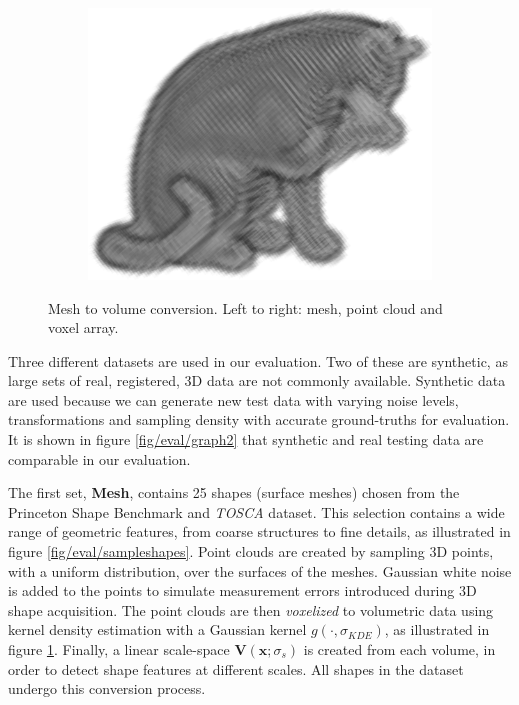 \begin{figure}[ht]
	\begin{subfigure}[t]{0.31\linewidth} \centering 
		\includegraphics[height=0.85\linewidth]{./fig/eval/cat_volume.png}
	\end{subfigure}
	\caption{Mesh to volume conversion. Left to right: mesh, point cloud and voxel array.} 
	\label{fig/eval/vol_conversion}
\end{figure}

Three different datasets are used in our evaluation. Two of these are synthetic, as large sets of real, registered, 3D data are not commonly available. Synthetic data are used because we can generate new test data with varying noise levels, transformations and sampling density with accurate ground-truths for evaluation. It is shown in figure \ref{fig/eval/graph2} that synthetic and real testing data are comparable in our evaluation. 

The first set, \textbf{Mesh}, contains 25 shapes (surface meshes) chosen from the Princeton Shape Benchmark \cite{Shilane2004} and \emph{TOSCA} \cite{Bronstein2008} dataset. This selection contains a wide range of geometric features, from coarse structures to fine details, as illustrated in figure \ref{fig/eval/sampleshapes}. Point clouds are created by sampling 3D points, with a uniform distribution, over the surfaces of the meshes. Gaussian white noise is added to the points to simulate measurement errors introduced during 3D shape acquisition. 
The point clouds are then \emph{voxelized} to volumetric data using kernel density estimation with a Gaussian kernel $g(\cdot,\sigma_{KDE})$, as illustrated in figure \ref{fig/eval/vol_conversion}.
Finally, a linear scale-space $\mathbf{V}(\mathbf{x};\sigma_s)$ is created from each volume, in order to detect shape features at different scales. All shapes in the dataset undergo this conversion process. 

